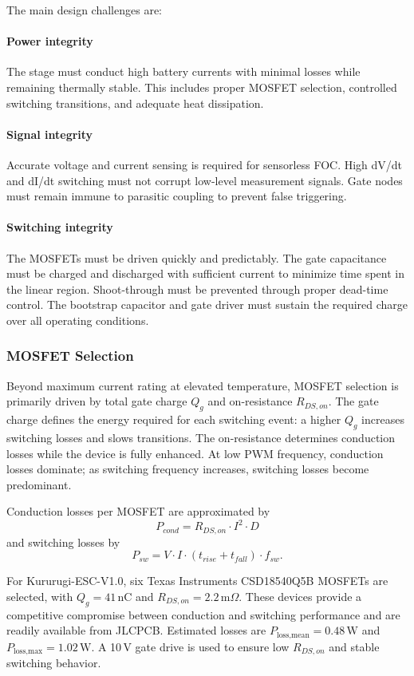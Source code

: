 \documentclass[a4paper, 10pt, conference]{IEEEtran} %
\begin{document}
The main design challenges are:
\paragraph{Power integrity}
The stage must conduct high battery currents with minimal losses while remaining thermally stable. This includes proper MOSFET selection, controlled switching transitions, and adequate heat dissipation.

\paragraph{Signal integrity}
Accurate voltage and current sensing is required for sensorless FOC. High dV/dt and dI/dt switching must not corrupt low-level measurement signals. Gate nodes must remain immune to parasitic coupling to prevent false triggering.

\paragraph{Switching integrity}
The MOSFETs must be driven quickly and predictably. The gate capacitance must be charged and discharged with sufficient current to minimize time spent in the linear region. Shoot-through must be prevented through proper dead-time control. The bootstrap capacitor and gate driver must sustain the required charge over all operating conditions. \\

\subsubsection*{MOSFET Selection}

Beyond maximum current rating at elevated temperature, MOSFET selection is primarily driven by total gate charge $Q_g$ and on-resistance $R_{DS,on}$. The gate charge defines the energy required for each switching event: a higher $Q_g$ increases switching losses and slows transitions. The on-resistance determines conduction losses while the device is fully enhanced. At low PWM frequency, conduction losses dominate; as switching frequency increases, switching losses become predominant.

Conduction losses per MOSFET are approximated by
\[
P_{cond} = R_{DS,on} \cdot I^2 \cdot D
\]
and switching losses by
\[
P_{sw} = V \cdot I \cdot (t_{rise} + t_{fall}) \cdot f_{sw}.
\]

For Kururugi-ESC-V1.0, six Texas Instruments CSD18540Q5B MOSFETs are selected, with $Q_g = 41\,\text{nC}$ and $R_{DS,on} = 2.2\,\text{m}\Omega$. These devices provide a competitive compromise between conduction and switching performance and are readily available from JLCPCB. Estimated losses are $P_{\text{loss,mean}} = 0.48\,\text{W}$ and $P_{\text{loss,max}} = 1.02\,\text{W}$. A 10\,V gate drive is used to ensure low $R_{DS,on}$ and stable switching behavior. \\
\end{document}
